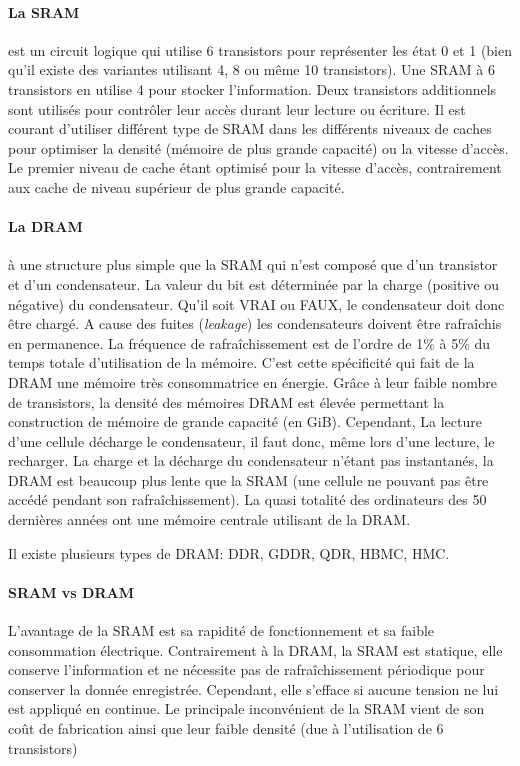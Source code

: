 \paragraph{La SRAM} est un circuit logique qui utilise 6 transistors pour représenter les état 0 et 1 (bien qu'il existe des variantes utilisant 4, 8 ou même 10 transistors). Une SRAM à 6 transistors en utilise 4 pour stocker l'information. Deux transistors additionnels sont utilisés pour contrôler leur accès durant leur lecture ou écriture.
Il est courant d'utiliser différent type de SRAM dans les différents niveaux de caches pour optimiser la densité (mémoire de plus grande capacité) ou la vitesse d'accès. Le premier niveau de cache étant optimisé pour la vitesse d'accès, contrairement aux cache de niveau supérieur de plus grande capacité.


\paragraph{La DRAM} à une structure plus simple que la SRAM qui n'est composé que d'un transistor et d'un condensateur. La valeur du bit est déterminée par la charge (positive ou négative) du condensateur. Qu'il soit VRAI ou FAUX, le condensateur doit donc être chargé. 
A cause des fuites (\textit{leakage}) les condensateurs doivent être rafraîchis en permanence. La fréquence de rafraîchissement est de l'ordre de 1\% à 5\% du temps totale d'utilisation de la mémoire. C'est cette spécificité qui fait de la DRAM une mémoire très consommatrice en énergie. Grâce à leur faible nombre de transistors, la densité des mémoires DRAM est élevée permettant la construction de mémoire de grande capacité (en GiB). Cependant, La lecture d'une cellule décharge le condensateur, il faut donc, même lors d'une lecture, le recharger.
La charge et la décharge du condensateur n'étant pas instantanés, la DRAM est beaucoup plus lente que la SRAM (une cellule ne pouvant pas être accédé pendant son rafraîchissement).
La quasi totalité des ordinateurs des 50 dernières années ont une mémoire centrale utilisant de la DRAM.

Il existe plusieurs types de DRAM: DDR, GDDR, QDR, HBMC, HMC.


\paragraph{SRAM vs DRAM}

L'avantage de la SRAM est sa rapidité de fonctionnement et sa faible consommation électrique. Contrairement à la DRAM, la SRAM est statique, elle conserve l'information et ne nécessite pas de rafraîchissement périodique pour conserver la donnée enregistrée. Cependant, elle s'efface si aucune tension ne lui est appliqué en continue.
Le principale inconvénient de la SRAM vient de son coût de fabrication ainsi que leur faible densité (due à l'utilisation de 6 transistors)


